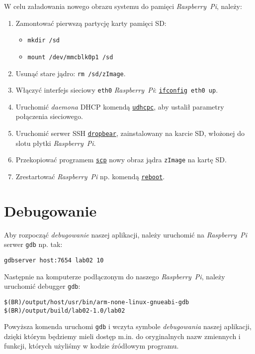 \documentclass{article}
\begin{document}
W celu załadowania nowego obrazu systemu do pamięci \emph{Raspberry~Pi}, należy:
\begin{enumerate}
\item Zamontować pierwszą partycję karty pamięci SD:
\begin{itemize}
\item \texttt{mkdir /sd}
\item \texttt{mount /dev/mmcblk0p1 /sd}
\end{itemize}
\item Usunąć stare jądro: \texttt{rm /sd/zImage}.
\item Włączyć interfejs sieciowy \texttt{eth0} \emph{Raspberry~Pi}: \texttt{\href{http://linux.die.net/man/8/ifconfig}{ifconfig} eth0 up}.
\item Uruchomić \emph{daemona} DHCP komendą \texttt{\href{http://dev.man-online.org/man8/udhcpc/}{udhcpc}}, aby ustalił parametry połączenia sieciowego.
\item Uruchomić serwer SSH \texttt{\href{https://matt.ucc.asn.au/dropbear/dropbear.html}{dropbear}}, zainstalowany na karcie SD, włożonej do slotu płytki \emph{Raspberry~Pi}.
\item Przekopiować programem \texttt{\href{http://linux.die.net/man/1/scp}{scp}} nowy obraz jądra \texttt{zImage} na kartę SD.
\item Zrestartować \emph{Raspberry~Pi} np. komendą \texttt{\href{http://linux.die.net/man/8/reboot}{reboot}}.
\end{enumerate}


\section{Debugowanie}

Aby rozpocząć \emph{debugowanie} naszej aplikacji, należy uruchomić na \emph{Raspberry~Pi} serwer \texttt{gdb} np. tak:
\begin{center}
\texttt{gdbserver host:7654 lab02 10}
\end{center}
Następnie na komputerze podłączonym do naszego \emph{Raspberry~Pi}, należy uruchomić debugger \texttt{gdb}:
\begin{center}
\texttt{\$(BR)/output/host/usr/bin/arm-none-linux-gnueabi-gdb \$(BR)/output/build/lab02-1.0/lab02}
\end{center}
Powyższa komenda uruchomi \texttt{gdb} i wczyta symbole \emph{debugowania} naszej aplikacji, dzięki którym będziemy mieli dostęp m.in. do oryginalnych nazw zmiennych i funkcji, których użyliśmy w kodzie źródłowym programu.
\end{document}
